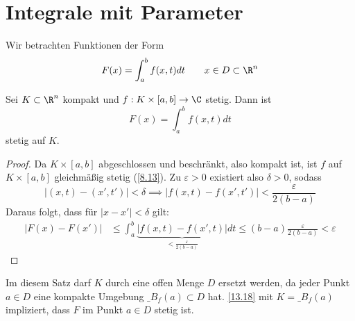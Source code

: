 \documentclass[a4paper,10pt]{scrbook}
\begin{document}
\section{Integrale mit Parameter}

Wir betrachten Funktionen der Form
\[
F(x) = \int_a^bf(x,t)dt \qquad x\in D\subset \R^n
\]

\begin{st}
\label{13.18}
Sei $K\subset \R^n$ kompakt und $f:K\times [a,b]\to \C$ stetig.
Dann ist
\[
F(x) = \int_a^bf(x,t)dt
\]
stetig auf $K$.

\begin{proof}
Da $K\times[a,b]$ abgeschlossen und beschränkt, also kompakt ist, ist $f$ auf $K\times [a,b]$ gleichmäßig stetig (\ref{8.13}).
Zu $\varepsilon>0$ existiert also $\delta>0$, sodass
\[
|(x,t)-(x',t')| < \delta \implies |f(x,t)-f(x',t')| < \frac \varepsilon {2(b-a)}
\]
Daraus folgt, dass für $|x-x'| < \delta$ gilt:
\begin{align*}
|F(x)-F(x')| &\le \int_a^b\underbrace{|f(x,t)-f(x',t)|}_{< \frac \varepsilon{2(b-a)}} dt
\le (b-a)\frac \varepsilon{2(b-a)} < \varepsilon
\end{align*}
\end{proof}

\begin{note}
Im diesem Satz darf $K$ durch eine offen Menge $D$ ersetzt werden, da jeder Punkt $a\in D$ eine kompakte Umgebung $\_{B_f(a)}\subset D$ hat.
\ref{13.18} mit $K=\_{B_f(a)}$ impliziert, dass $F$ im Punkt $a\in D$ stetig ist. 
\end{note}
\end{st}
\end{document}
